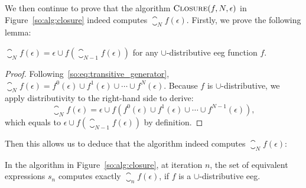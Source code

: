 We then continue to prove that the algorithm $\textsc{Closure}(f, N, \epsilon)$
in Figure~\ref{so:alg:closure} indeed computes $\closure_N f(\epsilon)$.
Firstly, we prove the following lemma:
\begin{lemma}
    $\closure_N f(\epsilon) = \epsilon \cup f \left( \closure_{N-1} f(\epsilon)
    \right)$ for any $\cup$-distributive \gls{eeg} function $f$.
    {}\label{so:lem:transitive}
\end{lemma}
\begin{proof}
    Following~\eqref{so:eq:transitive_generator}, $\closure_N f(\epsilon) =
    f^0(\epsilon) \cup f^1(\epsilon) \cup \cdots \cup f^N(\epsilon)$.  Because
    $f$ is $\cup$-distributive, we apply distributivity to the right-hand side
    to derive:
    \begin{equation}
        \closure_N f(\epsilon) = \epsilon \cup f\left(
            f^0(\epsilon) \cup f^1(\epsilon) \cup \cdots \cup f^{N-1}(\epsilon)
        \right),
    \end{equation}
    which equals to $\epsilon \cup f\left( \closure_{N-1} f(\epsilon) \right)$
    by definition.
\end{proof}
Then this allows us to deduce that the algorithm indeed computes $\closure_N
f(\epsilon)$:
\begin{theorem}
    In the algorithm in Figure~\ref{so:alg:closure}, at iteration $n$, the set
    of equivalent expressions $s_n$ computes exactly $\closure_n f(\epsilon)$,
    if $f$ is a $\cup$-distributive \gls{eeg}\@.
    \label{so:thm:closure}
\end{theorem}
